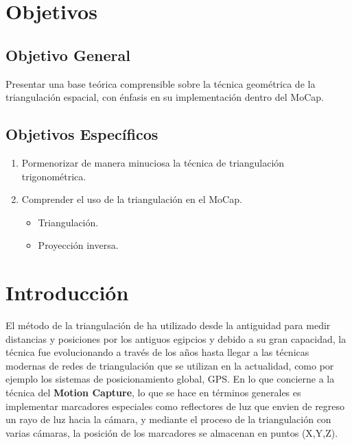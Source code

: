 \documentclass[11pt,letterpaper]{article}     %
\begin{document}
\section{Objetivos}
\subsection{Objetivo General}
Presentar una base te\' orica comprensible sobre la t\' ecnica geom\' etrica de la triangulaci\' on espacial, con \' enfasis en su implementaci\' on dentro del MoCap.
\subsection{Objetivos Espec\' ificos} 
\begin{enumerate}
\item Pormenorizar de manera minuciosa la t\' ecnica  de triangulaci\' on trigonom\' etrica.

\item Comprender el uso de la triangulaci\' on en el MoCap.
\begin{itemize}
\item Triangulaci\' on.
\item Proyecci\' on inversa.
\end{itemize}
\end{enumerate}

\section{Introducci\' on}

El m\' etodo de la triangulaci\' on de ha utilizado desde la antiguidad para medir distancias y posiciones por los antiguos egipcios y debido a su gran capacidad, la t\' ecnica fue evolucionando a trav\' es de los a\~ nos hasta llegar a las t\' ecnicas modernas de redes de triangulaci\' on que se utilizan en la actualidad, como por ejemplo los sistemas de posicionamiento global, GPS.
En lo que concierne a la t\' ecnica del \textbf{Motion Capture}, lo que se hace en t\' erminos generales es implementar marcadores especiales como reflectores de luz que envien de regreso un rayo de luz hacia la c\' amara, y mediante el proceso de la triangulaci\' on con varias c\' amaras, la posici\' on de los marcadores se almacenan en puntos (X,Y,Z).
\end{document}
